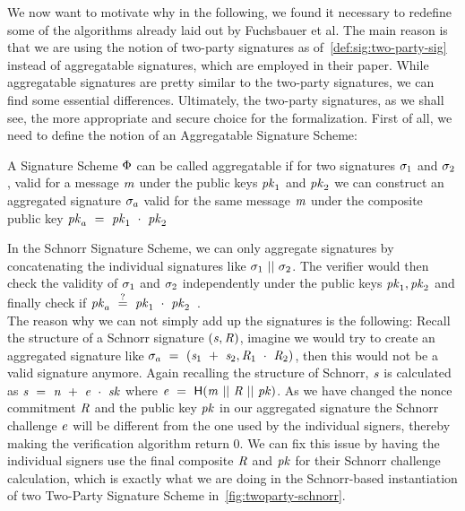 We now want to motivate why in the following, we found it necessary to redefine some of the algorithms already laid out by Fuchsbauer et al.
The main reason is that we are using the notion of two-party signatures as of~\cref{def:sig:two-party-sig} instead of aggregatable signatures, which are employed in their paper.
While aggregatable signatures are pretty similar to the two-party signatures, we can find some essential differences.
Ultimately, the two-party signatures, as we shall see, the more appropriate and secure choice for the formalization.
First of all, we need to define the notion of an Aggregatable Signature Scheme:
\begin{definition} \label{def:atom:aggsig}
    A Signature Scheme $\Phi$ can be called aggregatable if for two signatures $\sigma_1$ and $\sigma_2$, valid for a message $\mathit{m}$ under the public keys $\mathit{pk}_1$ and $\mathit{pk}_2$ we can construct an aggregated signature $\sigma_a$ valid for the same message $\mathit{m}$ under the composite public key $\mathit{pk}_a ~=~ \mathit{pk}_1 ~\cdot~ \mathit{pk}_2$
\end{definition}
In the Schnorr Signature Scheme, we can only aggregate signatures by concatenating the individual signatures like $\sigma_1 ~||~ \sigma_2$.
The verifier would then check the validity of $\sigma_1$ and $\sigma_2$ independently under the public keys $\mathit{pk}_1, \mathit{pk}_2$ and finally check if $\mathit{pk}_a ~\stackrel{?}{=}~ \mathit{pk}_1 ~\cdot~ \mathit{pk}_2$~\cite{fuchsbauer2019aggregate}. \\
The reason why we can not simply add up the signatures is the following:
Recall the structure of a Schnorr signature $(\mathit{s}, \mathit{R})$, imagine we would try to create an aggregated signature like $\sigma_a ~=~ (\mathit{s}_1 ~+~ \mathit{s}_2, \mathit{R}_1 ~\cdot~ \mathit{R}_2)$, then this would not be a valid signature anymore.
Again recalling the structure of Schnorr, $\mathit{s}$ is calculated as $\mathit{s} ~=~ \mathit{n} ~+~ \mathit{e} ~\cdot~ \mathit{sk}$ where $\mathit{e} ~=~ \mathsf{H} (\mathit{m} ~||~ \mathit{R} ~||~ \mathit{pk})$.
As we have changed the nonce commitment $\mathit{R}$ and the public key $\mathit{pk}$ in our aggregated signature the Schnorr challenge $\mathit{e}$ will be different from the one used by the individual signers, thereby making the verification algorithm return 0.
We can fix this issue by having the individual signers use the final composite $\mathit{R}$ and $\mathit{pk}$ for their Schnorr challenge calculation, which is exactly what we are doing in the Schnorr-based instantiation of two Two-Party Signature Scheme in~\cref{fig:twoparty-schnorr}.

